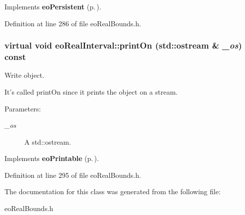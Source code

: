 Implements {\bf eo\-Persistent} {\rm (p.\,\pageref{classeo_persistent_a1})}.

Definition at line 286 of file eo\-Real\-Bounds.h.
\subsubsection{\setlength{\rightskip}{0pt plus 5cm}virtual void eo\-Real\-Interval::print\-On (std::ostream \& {\em \_\-os}) const\hspace{0.3cm}{\tt  [inline, virtual]}}\label{classeo_real_interval_a14}


Write object. 

It's called print\-On since it prints the object on a stream. \begin{Desc}
\item[Parameters:]
\begin{description}
\item[{\em \_\-os}]A std::ostream. \end{description}
\end{Desc}


Implements {\bf eo\-Printable} {\rm (p.\,\pageref{classeo_printable_a1})}.

Definition at line 295 of file eo\-Real\-Bounds.h.

The documentation for this class was generated from the following file:\begin{CompactItemize}
\item 
eo\-Real\-Bounds.h\end{CompactItemize}
